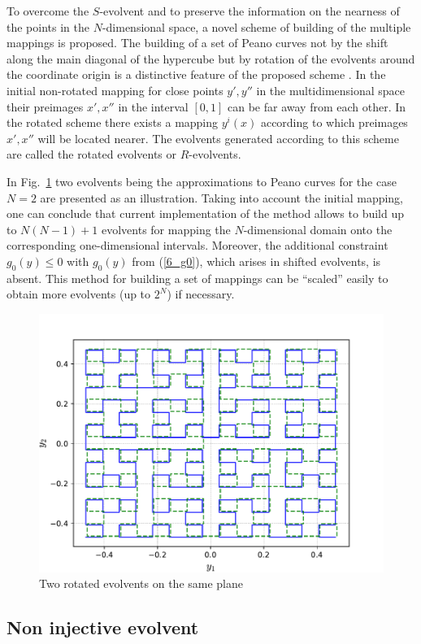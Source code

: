 \documentclass[runningheads]{llncs}
\begin{document}
To overcome the $S$-evolvent and to preserve the information on the nearness of the points in the $N$-dimensional space, a novel scheme of building of the multiple mappings is proposed. The building of a set of Peano curves not by the shift along the main diagonal of the hypercube but by rotation of the evolvents around the coordinate origin is a distinctive feature of the proposed scheme \cite{Gergel2009}. In the initial non-rotated mapping for close points $y', y''$ in the multidimensional space their preimages  $x', x''$ in the interval $[0,1]$ can be far away from each other. In the rotated scheme there exists a mapping $y^i(x)$ according to which preimages $x', x''$ will be located nearer. The evolvents generated according to this scheme are called the rotated evolvents or $R$-evolvents.

In Fig.~\ref{6_fig_9} two evolvents being the approximations to Peano curves for the case $N=2$ are presented as an illustration.
Taking into account the initial mapping, one can conclude that current implementation of the method allows to build up to $N(N-1)+1$ evolvents for mapping the $N$-dimensional domain onto the corresponding one-dimensional intervals. Moreover, the additional constraint  $g_0(y) \leq 0$ with $g_0(y)$ from (\ref{6_g0}), which arises in shifted evolvents, is absent. This method for building a set of mappings can be ``scaled'' easily to obtain more evolvents (up to $2^N$) if necessary.

\begin{figure}[t]
  \centering
  \includegraphics[width=0.6\linewidth]{pictures/rotated_1.pdf}
  \caption{Two rotated evolvents on the same plane}
  \label{6_fig_9}
\end{figure}

\subsection{Non injective evolvent}
\end{document}
